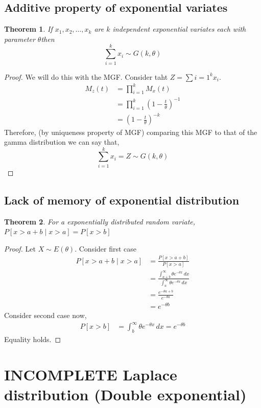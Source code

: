 \documentclass[oneside,11pt,pdftex]{book}%
\numberwithin{equation}{section}
\newtheorem{theorem}{Theorem}[chapter]%
\numberwithin{section}{chapter}
\numberwithin{equation}{chapter}
\begin{document}
\subsection{Additive property of exponential variates}
\begin{theorem}
	If $ x_1,x_2,\dots,x_k $ are $ k $ independent exponential variates each with parameter $ \theta  $then \[ \sum_{i=1}^k x_i \sim G(k, \theta)\]
\end{theorem}
\begin{proof}
	We will do this with the MGF. Consider taht $ Z=\sum{i=1}^{k} x_i $.
	\begin{align*}
		M_z(t)&=\prod_{i=1}^{k} M_x(t)\\
		&= \prod_{i=1}^k \left(1- \frac{t}{\theta}\right)^{-1}\\
		&= \left(1- \frac{t}{\theta}\right)^{-k}
	\end{align*}
Therefore, (by uniqueness property of MGF) comparing this MGF to that of the gamma distribution we can say that,
$$ \sum_{i=1}^k x_i = Z \sim G(k,\theta)$$
\end{proof}

\subsection{Lack of memory of exponential distribution}
\begin{theorem}
	For a exponentially distributed random variate, $ P[x>a+b \mid x>a]=P[x>b] $
\end{theorem}
\begin{proof}
	Let $ X \sim E(\theta) $. Consider first case
	\begin{align*}
		P[x>a+b \mid x>a]&= \frac{P[x>a+b]}{P[x>a]}\\
		&=\frac{\int_{a+b}^\infty \theta e^{-\theta x}\, dx}{\int_a^\infty \theta e^{-\theta x}\, dx}\\
		&=\frac{e^{-\theta a+b}}{e^{-\theta a}}\\
		&=e^{-\theta b}
	\end{align*}
	Consider second case now,
	\begin{align*}
		P[x>b]&=\int_b^{\infty }\theta e^{-\theta x}\, dx=e^{-\theta b}
	\end{align*}
	Equality holds.
\end{proof}

\section{INCOMPLETE Laplace distribution (Double exponential)}
\end{document}
